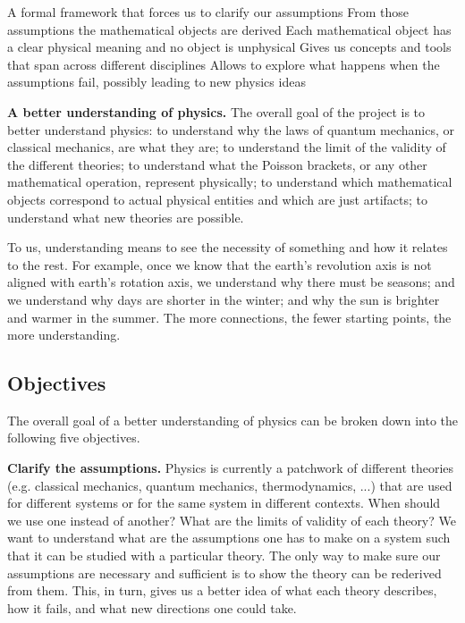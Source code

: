 \documentclass[twocolumn]{article}
\begin{document}
A formal framework that forces us to clarify our assumptions
From those assumptions the mathematical objects are derived
Each mathematical object has a clear physical meaning and no object is unphysical
Gives us concepts and tools that span across different disciplines
Allows to explore what happens when the assumptions fail, possibly leading to new physics ideas


\textbf{A better understanding of physics.} The overall goal of the project is to better understand physics: to understand why the laws of quantum mechanics, or classical mechanics, are what they are; to understand the limit of the validity of the different theories; to understand what the Poisson brackets, or any other mathematical operation, represent physically; to understand which mathematical objects correspond to actual physical entities and which are just artifacts; to understand what new theories are possible.

To us, understanding means to see the necessity of something and how it relates to the rest. For example, once we know that the earth's revolution axis is not aligned with earth's rotation axis, we understand why there must be seasons; and we understand why days are shorter in the winter; and why the sun is brighter and warmer in the summer. The more connections, the fewer starting points, the more understanding.

\subsection{Objectives}

The overall goal of a better understanding of physics can be broken down into the following five objectives.

\textbf{Clarify the assumptions.} Physics is currently a patchwork of different theories (e.g. classical mechanics, quantum mechanics, thermodynamics, ...) that are used for different systems or for the same system in different contexts. When should we use one instead of another? What are the limits of validity of each theory? We want to understand what are the assumptions one has to make on a system such that it can be studied with a particular theory. The only way to make sure our assumptions are necessary and sufficient is to show the theory can be rederived from them. This, in turn, gives us a better idea of what each theory describes, how it fails, and what new directions one could take.
\end{document}
